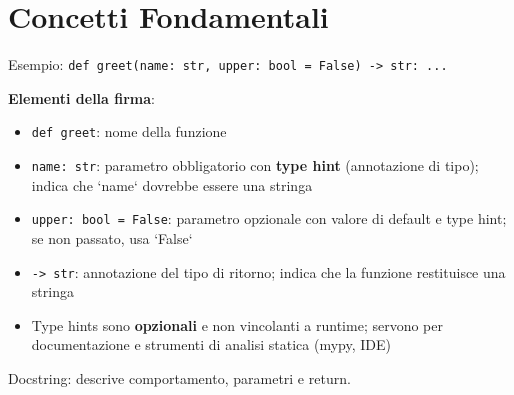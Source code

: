 \section{Concetti Fondamentali}
\label{sec:fun-concetti}
\begin{tcolorbox}[title=Firma delle Funzioni]
Esempio: \texttt{def greet(name: str, upper: bool = False) -> str: ...}

\textbf{Elementi della firma}:
\begin{itemize}
  \item \texttt{def greet}: nome della funzione
  \item \texttt{name: str}: parametro obbligatorio con \textbf{type hint} (annotazione di tipo); indica che `name` dovrebbe essere una stringa
  \item \texttt{upper: bool = False}: parametro opzionale con valore di default e type hint; se non passato, usa `False`
  \item \texttt{-> str}: annotazione del tipo di ritorno; indica che la funzione restituisce una stringa
  \item Type hints sono \textbf{opzionali} e non vincolanti a runtime; servono per documentazione e strumenti di analisi statica (mypy, IDE)
\end{itemize}

Docstring: descrive comportamento, parametri e return.
\end{tcolorbox}

